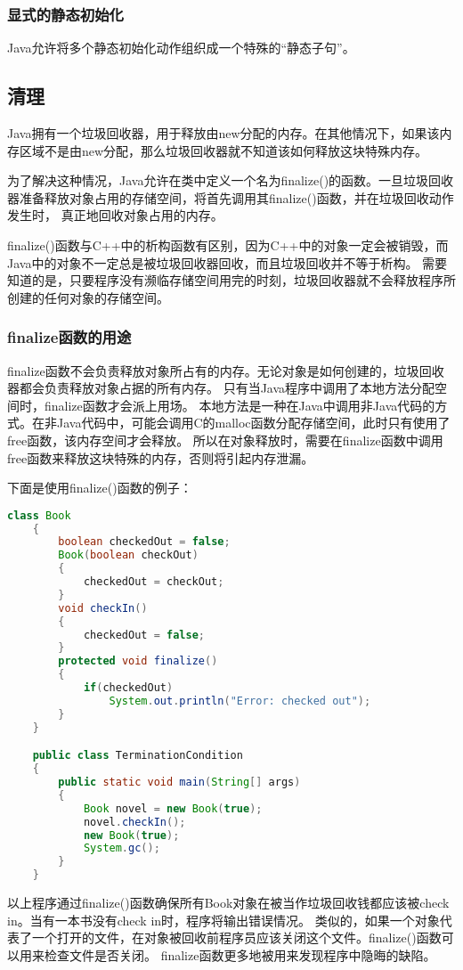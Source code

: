 \documentclass[a4paper,left=2.5cm,right=2.5cm,11pt]{article}
\begin{document}
\subsubsection{显式的静态初始化}
	Java允许将多个静态初始化动作组织成一个特殊的“静态子句”。

\subsection{清理}
	Java拥有一个垃圾回收器，用于释放由new分配的内存。在其他情况下，如果该内存区域不是由new分配，那么垃圾回收器就不知道该如何释放这块特殊内存。\par
	为了解决这种情况，Java允许在类中定义一个名为finalize()的函数。一旦垃圾回收器准备释放对象占用的存储空间，将首先调用其finalize()函数，并在垃圾回收动作发生时，
	真正地回收对象占用的内存。\par
	finalize()函数与C++中的析构函数有区别，因为C++中的对象一定会被销毁，而Java中的对象不一定总是被垃圾回收器回收，而且垃圾回收并不等于析构。
	需要知道的是，只要程序没有濒临存储空间用完的时刻，垃圾回收器就不会释放程序所创建的任何对象的存储空间。\par

\subsubsection{finalize函数的用途}
	finalize函数不会负责释放对象所占有的内存。无论对象是如何创建的，垃圾回收器都会负责释放对象占据的所有内存。
	只有当Java程序中调用了本地方法分配空间时，finalize函数才会派上用场。
	本地方法是一种在Java中调用非Java代码的方式。在非Java代码中，可能会调用C的malloc函数分配存储空间，此时只有使用了free函数，该内存空间才会释放。
	所以在对象释放时，需要在finalize函数中调用free函数来释放这块特殊的内存，否则将引起内存泄漏。\par

	下面是使用finalize()函数的例子：
	\begin{lstlisting}[language = Java]
	class Book
	{
		boolean checkedOut = false;
		Book(boolean checkOut)
		{
			checkedOut = checkOut;
		}
		void checkIn()
		{
			checkedOut = false;
		}
		protected void finalize()
		{
			if(checkedOut)
				System.out.println("Error: checked out");
		}
	}

	public class TerminationCondition
	{
		public static void main(String[] args)
		{
			Book novel = new Book(true);
			novel.checkIn();
			new Book(true);
			System.gc();
		}
	}
	\end{lstlisting}

	以上程序通过finalize()函数确保所有Book对象在被当作垃圾回收钱都应该被check in。当有一本书没有check in时，程序将输出错误情况。
	类似的，如果一个对象代表了一个打开的文件，在对象被回收前程序员应该关闭这个文件。finalize()函数可以用来检查文件是否关闭。
	finalize函数更多地被用来发现程序中隐晦的缺陷。
\end{document}
